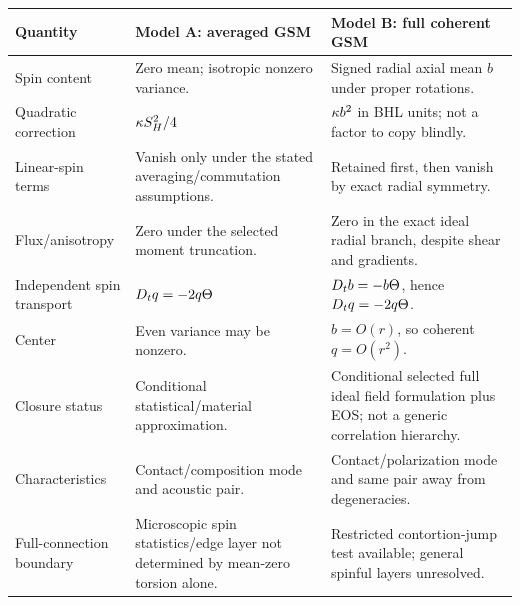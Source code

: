 \begin{longtable}{p{}p{}p{}}
\toprule Quantity & Model A: averaged GSM & Model B: full coherent GSM\\\midrule\endhead
Spin content & Zero mean; isotropic nonzero variance. & Signed radial axial mean $b$ under proper rotations.\\
Quadratic correction & $\kappa S_H^2/4$ & $\kappa b^2$ in BHL units; not a factor to copy blindly.\\
Linear-spin terms & Vanish only under the stated averaging/commutation assumptions. & Retained first, then vanish by exact radial symmetry.\\
Flux/anisotropy & Zero under the selected moment truncation. & Zero in the exact ideal radial branch, despite shear and gradients.\\
Independent spin transport & $D_t q=-2q\Theta$ & $D_t b=-b\Theta$, hence $D_t q=-2q\Theta$.\\
Center & Even variance may be nonzero. & $b=O(r)$, so coherent $q=O(r^2)$.\\
Closure status & Conditional statistical/material approximation. & Conditional selected full ideal field formulation plus EOS; not a generic correlation hierarchy.\\
Characteristics & Contact/composition mode and acoustic pair. & Contact/polarization mode and same pair away from degeneracies.\\
Full-connection boundary & Microscopic spin statistics/edge layer not determined by mean-zero torsion alone. & Restricted contortion-jump test available; general spinful layers unresolved.\\\bottomrule
\end{longtable}
